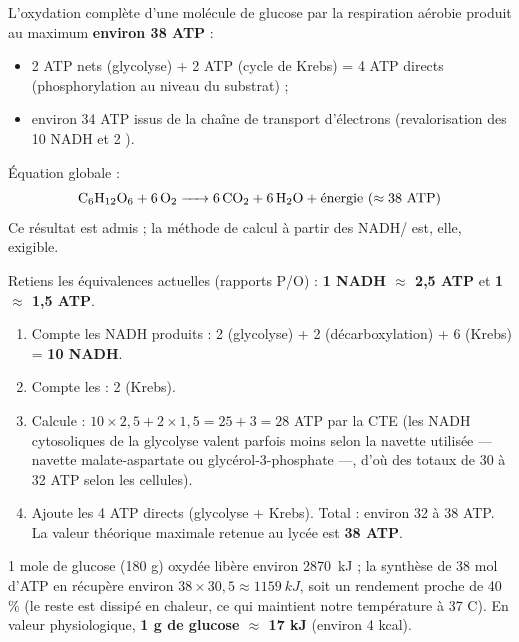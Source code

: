 \documentclass[11pt]{article}
\begin{document}
\begin{propriete}
L'oxydation complète d'une molécule de glucose par la respiration aérobie produit au maximum \textbf{environ 38 ATP} :
\begin{itemize}
\item 2 ATP nets (glycolyse) + 2 ATP (cycle de Krebs) = 4 ATP directs (phosphorylation au niveau du substrat) ;
\item environ 34 ATP issus de la chaîne de transport d'électrons (revalorisation des 10 NADH et 2 ).
\end{itemize}
Équation globale : \[\ce{C6H12O6 + 6 O2 -> 6 CO2 + 6 H2O} + \text{énergie } (\approx 38\ \text{ATP})\]
Ce résultat est admis ; la méthode de calcul à partir des NADH/ est, elle, exigible.
\end{propriete}

\begin{methode}
Retiens les équivalences actuelles (rapports P/O) : \textbf{1 NADH $\approx$ 2,5 ATP} et \textbf{1  $\approx$ 1,5 ATP}.
\begin{enumerate}
\item Compte les NADH produits : 2 (glycolyse) + 2 (décarboxylation) + 6 (Krebs) = \textbf{10 NADH}.
\item Compte les  : 2 (Krebs).
\item Calcule : $10 \times 2{,}5 + 2 \times 1{,}5 = 25 + 3 = 28$ ATP par la CTE (les NADH cytosoliques de la glycolyse valent parfois moins selon la navette utilisée — navette malate-aspartate ou glycérol-3-phosphate —, d'où des totaux de 30 à 32 ATP selon les cellules).
\item Ajoute les 4 ATP directs (glycolyse + Krebs). Total : environ 32 à 38 ATP. La valeur théorique maximale retenue au lycée est \textbf{38 ATP}.
\end{enumerate}
\end{methode}

\begin{exemplebox}
1 mole de glucose (180 g) oxydée libère environ \SI{2870}{kJ} ; la synthèse de 38 mol d'ATP en récupère environ $38 \times 30{,}5 \approx \SI{1159}{kJ}$, soit un rendement proche de 40 \% (le reste est dissipé en chaleur, ce qui maintient notre température à 37 \textdegree C). En valeur physiologique, \textbf{1 g de glucose $\approx$ 17 kJ} (environ 4 kcal).
\end{exemplebox}
\end{document}
